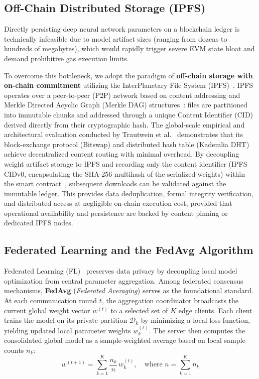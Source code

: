 \subsection{Off-Chain Distributed Storage (IPFS)}
Directly persisting deep neural network parameters on a blockchain ledger is technically infeasible due to model artifact sizes (ranging from dozens to hundreds of megabytes), which would rapidly trigger severe EVM state bloat and demand prohibitive gas execution limits.

To overcome this bottleneck, we adopt the paradigm of \textbf{off-chain storage with on-chain commitment} utilizing the InterPlanetary File System (IPFS)~\cite{benet2014ipfs, daniel2022ipfs}. IPFS operates over a peer-to-peer (P2P) network based on content addressing and Merkle Directed Acyclic Graph (Merkle DAG) structures~\cite{daniel2022ipfs, trautwein2022design}: files are partitioned into immutable chunks and addressed through a unique Content Identifier (CID) derived directly from their cryptographic hash. The global-scale empirical and architectural evaluation conducted by Trautwein et al.~\cite{trautwein2022design} demonstrates that its block-exchange protocol (Bitswap) and distributed hash table (Kademlia DHT) achieve decentralized content routing with minimal overhead. By decoupling weight artifact storage to IPFS and recording only the content identifier (IPFS CIDv0, encapsulating the SHA-256 multihash of the serialized weights) within the smart contract~\cite{zhao2021privacy}, subsequent downloads can be validated against the immutable ledger. This provides data deduplication, formal integrity verification, and distributed access at negligible on-chain execution cost, provided that operational availability and persistence are backed by content pinning or dedicated IPFS nodes.

\subsection{Federated Learning and the FedAvg Algorithm}
Federated Learning (FL)~\cite{mcmahan2017federated} preserves data privacy by decoupling local model optimization from central parameter aggregation. Among federated consensus mechanisms, \textbf{FedAvg} (\textit{Federated Averaging}) serves as the foundational standard. At each communication round $t$, the aggregation coordinator broadcasts the current global weight vector $w^{(t)}$ to a selected set of $K$ edge clients. Each client trains the model on its private partition $\mathcal{D}_k$ by minimizing a local loss function, yielding updated local parameter weights $w_k^{(t)}$. The server then computes the consolidated global model as a sample-weighted average based on local sample counts $n_k$:
\begin{equation}
w^{(t+1)} = \sum_{k=1}^{K} \frac{n_k}{n} \, w_k^{(t)}, \quad \text{where } n = \sum_{k=1}^{K} n_k
\end{equation}

